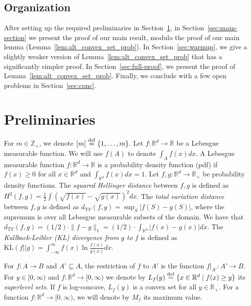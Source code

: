\documentclass[final,12pt]{colt2018}
\newcommand{\new}[1]{{\color{red} #1}}
\newcommand{\new}[1]{{#1}}
\newtheorem{informal theorem}[theorem]{Theorem (informal statement)}
\newcommand{\eqdef}{\stackrel{{\mathrm {\footnotesize def}}}{=}}
\newcommand{\R}{\mathbb{R}}
\newcommand{\Z}{\mathbb{Z}}
\newcommand{\dtv}{d_{\mathrm TV}}
\newcommand{\KL}{\mathrm{KL}}
\begin{document}
\subsection{Organization}
After setting up the required preliminaries in Section~\ref{sec:prelims}, in 
Section~\ref{sec:main-section} we present the proof of our main result, modulo 
the proof of our main lemma (Lemma~\ref{lem:alt_convex_set_prob}).
In Section~\ref{sec:warmup}, we give a slightly weaker version of 
Lemma~\ref{lem:alt_convex_set_prob} that has a significantly simpler proof.
In Section~\ref{sec:full-proof}, we present the proof of Lemma~\ref{lem:alt_convex_set_prob}.
Finally, we conclude with a few open problems in Section~\ref{sec:conc}. 



\section{Preliminaries} \label{sec:prelims}


\new{For $m \in \Z_+$, we denote $[m] \eqdef \{1, \ldots, m\}$.}
Let $f: \R^d \to \R$ be a Lebesgue measurable function.
We will use $f(A)$ to denote $\int_{A} f(x) dx$.
A Lebesgue measurable function $f: \R^d \to \R$ is a probability density function (pdf)
if $f(x) \geq 0$ for all $x \in \R^d$ and  $\int_{\R^d} f(x) dx = 1$.
Let $f, g: \R^d \to \R_+$ be probability density functions.
The {\em squared Hellinger distance} between $f, g$ is defined as $H^2(f, g) = \frac{1}{2} \int \left( \sqrt{f(x)} - \sqrt{g(x)} \right)^2 dx$.
The {\em total variation distance} between $f, g$ 
is defined as $\dtv(f, g) = \sup_{S} |f(S) - g(S)|$, where
the supremum is over all Lebesgue measurable subsets of the domain.
We have that $\dtv\left(f, g \right) = (1/2) \cdot \| f -g  \|_1 = (1/2) \cdot \int_{\R^d} |f(x) - g(x)| dx.$
The  {\em Kullback-Leibler (KL) divergence from $g$ to $f$} is defined as
$\KL(f || g) = \int_{-\infty}^{\infty} f(x) \ln \frac{f(x)}{g(x)} dx$.

\new{For $f : A \rightarrow B$ and $A' \subseteq A$, 
the restriction of $f$ to $A'$ is the function $f\vert_{A'} : A' \rightarrow B$.}
For $y \in [0,\infty)$ and $f: \R^d \to [0,\infty)$
we denote by $L_f(y) \eqdef \{x \in \R^d \mid f(x) \geq y\}$
its {\em superlevel sets}. If $f$ is log-concave, $L_f(y)$ is a convex set for all $y \in \R_+$.
For a function $f: \R^d \to [0,\infty)$, we will denote by $M_f$ its maximum value.
\end{document}
